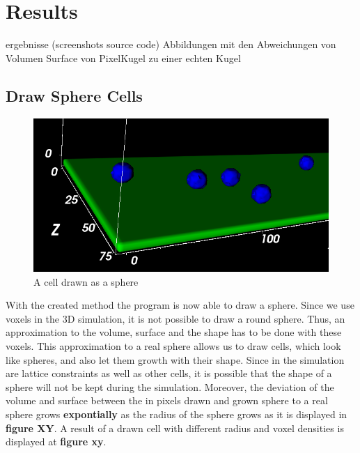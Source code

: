 \chapter{Results}
ergebnisse (screenshots \/ source code) \newline
Abbildungen mit den Abweichungen von Volumen Surface von PixelKugel zu einer echten Kugel 

\section{Draw Sphere Cells}
\begin{figure}
	\center
	\includegraphics[scale=0.6]{figures/DrawnSphereCell.png}
	\caption{A cell drawn as a sphere}
	\label{img:DrawnSphereCell}
\end{figure}
With the created method the program is now able to draw a sphere. Since we use voxels in the 3D simulation, it is not possible to draw a round sphere. Thus, an approximation to the volume, surface and the shape has to be done with these voxels. This approximation to a real sphere allows us to draw cells, which look like spheres, and also let them growth with their shape. Since in the simulation are lattice constraints as well as other cells, it is possible that the shape of a sphere will not be kept during the simulation. Moreover, the deviation of the volume and surface between the in pixels drawn and grown sphere to a real sphere grows \textbf{expontially} as the radius of the sphere grows as it is displayed in \textbf{figure XY}.
A result of a drawn cell with different radius and voxel densities is displayed at \textbf{figure xy}.


